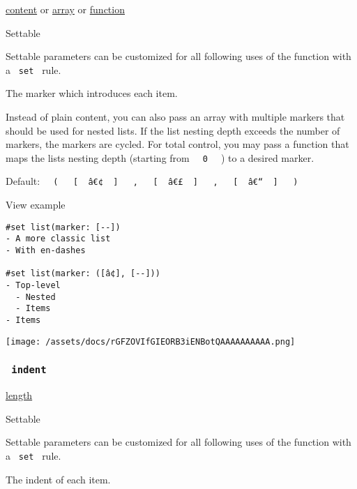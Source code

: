 \href{/docs/reference/foundations/content/}{content} {or}
\href{/docs/reference/foundations/array/}{array} {or}
\href{/docs/reference/foundations/function/}{function}

{{ Settable }}

\label{parameters-marker-settable-tooltip}
Settable parameters can be customized for all following uses of the
function with a \texttt{\ set\ } rule.

The marker which introduces each item.

Instead of plain content, you can also pass an array with multiple
markers that should be used for nested lists. If the list nesting depth
exceeds the number of markers, the markers are cycled. For total
control, you may pass a function that maps the list\textquotesingle s
nesting depth (starting from \texttt{\ }{\texttt{\ 0\ }}\texttt{\ } ) to
a desired marker.

Default:
\texttt{\ }{\texttt{\ (\ }}\texttt{\ }{\texttt{\ {[}\ }}\texttt{\ â€¢\ }{\texttt{\ {]}\ }}\texttt{\ }{\texttt{\ ,\ }}\texttt{\ }{\texttt{\ {[}\ }}\texttt{\ â€£\ }{\texttt{\ {]}\ }}\texttt{\ }{\texttt{\ ,\ }}\texttt{\ }{\texttt{\ {[}\ }}\texttt{\ â€“\ }{\texttt{\ {]}\ }}\texttt{\ }{\texttt{\ )\ }}\texttt{\ }


View example

\begin{verbatim}
#set list(marker: [--])
- A more classic list
- With en-dashes

#set list(marker: ([â¢], [--]))
- Top-level
  - Nested
  - Items
- Items
\end{verbatim}

\texttt{[image: /assets/docs/rGFZOVIfGIEORB3iENBotQAAAAAAAAAA.png]}

\subsubsection{\texorpdfstring{\texttt{\ indent\ }}{ indent }}\label{parameters-indent}

\href{/docs/reference/layout/length/}{length}

{{ Settable }}

\label{parameters-indent-settable-tooltip}
Settable parameters can be customized for all following uses of the
function with a \texttt{\ set\ } rule.

The indent of each item.


